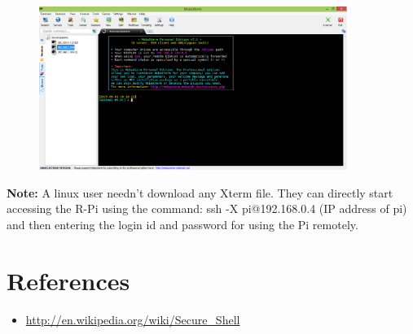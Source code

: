 \documentclass[11pt,a4paper]{article}
\begin{document}
\begin{enumerate}
\begin{figure}[h!]
			\includegraphics[width=10cm]{M5.PNG}
			\centering
		\end{figure}
	\end{enumerate}

	\textbf{Note:} A linux user needn't download any Xterm file. They can directly start accessing the R-Pi using the command: ssh -X pi@192.168.0.4 (IP address of pi) and then entering the login id and password for using the Pi remotely.
	
	\section{References}
	\begin{itemize}
		\item \url{http://en.wikipedia.org/wiki/Secure_Shell}
	\end{itemize}
\end{document}
